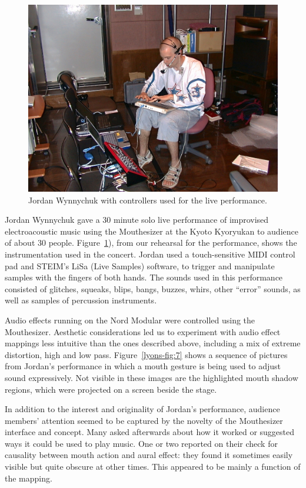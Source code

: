 \begin{figure}[t]
\centering
\includegraphics[width=\textwidth]{lyons_fig6}
\caption{Jordan Wynnychuk with controllers used for the live performance.}
\label{lyons-fig:6} 
\end{figure}

Jordan Wynnychuk gave a 30 minute solo live performance of improvised electroacoustic music using the Mouthesizer at the Kyoto Kyoryukan to audience of about 30 people. Figure~\ref{lyons-fig:6}), from our rehearsal for the performance, shows the instrumentation used in the concert. Jordan used a touch-sensitive MIDI control pad and STEIM's LiSa (Live Samples) software, to trigger and manipulate samples with the fingers of both hands. The sounds used in this performance consisted of glitches, squeaks, blips, bangs, buzzes, whirs, other “error” sounds, as well as samples of percussion instruments. 

Audio effects running on the Nord Modular were controlled using the Mouthesizer. Aesthetic considerations led us to experiment with audio effect mappings less intuitive than the ones described above, including a mix of extreme distortion, high and low pass. Figure~\ref{lyons-fig:7} shows a sequence of pictures from Jordan's performance in which a mouth gesture is being used to adjust sound expressively. Not visible in these images are the highlighted mouth shadow regions, which were projected on a screen beside the stage.

In addition to the interest and originality of Jordan's performance, audience members' attention seemed to be captured by the novelty of the Mouthesizer interface and concept. Many asked afterwards about how it worked or suggested ways it could be used to play music. One or two reported on their check for causality between mouth action and aural effect: they found it sometimes easily visible but quite obscure at other times. This appeared to be mainly a function of the mapping.

